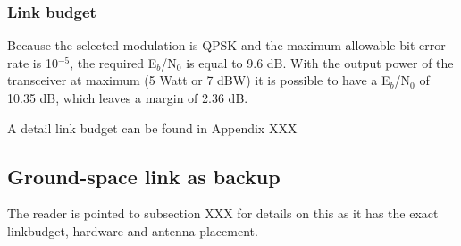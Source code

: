 \subsubsection{Link budget}
Because the selected modulation is QPSK and the maximum allowable bit error rate is 10$^{-5}$, the required E$_{b}$/N$_{0}$ is equal to 9.6 dB. With the output power of the transceiver at maximum (5 Watt or 7 dBW) it is possible to have a E$_{b}$/N$_{0}$ of 10.35 dB, which leaves a margin of 2.36 dB.

A detail link budget can be found in Appendix XXX

\subsection{Ground-space link as backup}
The reader is pointed to subsection XXX for details on this as it has the exact linkbudget, hardware and antenna placement. 